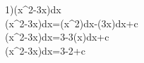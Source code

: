 1)\int(x^2-3x)dx
\\\int(x^2-3x)dx=\int(x^2)dx-\int(3x)dx+c
\\\int(x^2-3x)dx=3-3\int(x)dx+c
\\\int(x^2-3x)dx=3-2+c